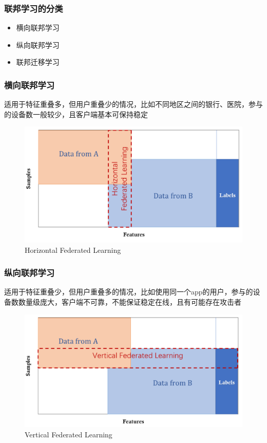 \documentclass[hyperref={pdfpagelabels=false}]{beamer}
\begin{document}
\begin{frame}
	\frametitle{联邦学习的分类}
	\begin{itemize}
		\item 横向联邦学习
		\item 纵向联邦学习
		\item 联邦迁移学习
	\end{itemize}
\end{frame}

\begin{frame}
	\frametitle{横向联邦学习}
	\begin{block}{}
		适用于特征重叠多，但用户重叠少的情况，比如不同地区之间的银行、医院，参与的设备数一般较少，且客户端基本可保持稳定
	\end{block}
	\begin{figure}
		\centering
		\includegraphics[width=.6\textwidth]{./figure/hor-fl.png}
		\caption{Horizontal Federated Learning\cite{Yang2019}}
	\end{figure}
\end{frame}

\begin{frame}
	\frametitle{纵向联邦学习}
	\begin{block}{}
		适用于特征重叠少，但用户重叠多的情况，比如使用同一个app的用户，参与的设备数数量级庞大，客户端不可靠，不能保证稳定在线，且有可能存在攻击者
	\end{block}
	\begin{figure}
		\centering
		\includegraphics[width=.6\textwidth]{./figure/ver-fl.png}
		\caption{Vertical Federated Learning\cite{Yang2019}}
	\end{figure}
\end{frame}
\end{document}

